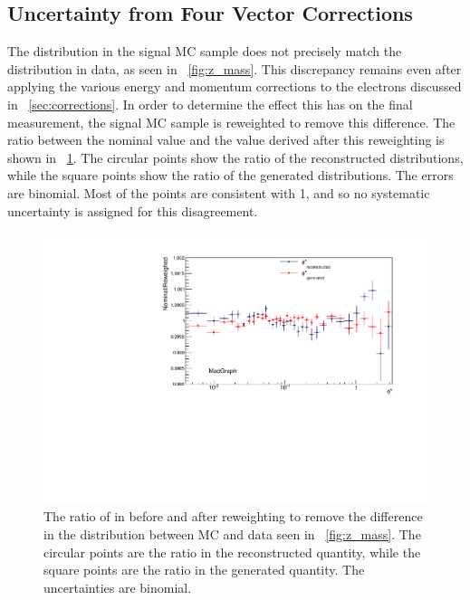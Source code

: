 \subsection{Uncertainty from Four Vector Corrections}
\label{four_vector_uncertainty}

The \mee distribution in the \MADGRAPH signal MC sample does not precisely
match the distribution in data, as seen in \FIG~\ref{fig:z_mass}. This
discrepancy remains even after applying the various energy and momentum
corrections to the electrons discussed in \SEC~\ref{sec:corrections}. In order
to determine the effect this has on the final measurement, the \MADGRAPH signal
MC sample is reweighted to remove this difference. The ratio between the
nominal \phistar value and the value derived after this reweighting is shown in
\FIG~\ref{fig:z_mass_reweighted}. The circular points show the ratio of the
reconstructed \phistar distributions, while the square points show the ratio of
the generated \phistar distributions. The errors are binomial. Most of the
points are consistent with \num{1}, and so no systematic uncertainty is
assigned for this disagreement.

\begin{figure}[!htbp]
    \centering
    \includegraphics[width=\textwidth]{figures/ZMass_reweighed.pdf}
    \caption[
        The ratio of \phistar in \MADGRAPH before and after reweighting to
        remove the differnce in the \mee distribution between MC and data.
    ]{
        The ratio of \phistar in \MADGRAPH before and after reweighting to
        remove the difference in the \mee distribution between MC and data seen
        in \FIG~\ref{fig:z_mass}. The circular points are the ratio in the
        reconstructed quantity, while the square points are the ratio in the
        generated quantity. The uncertainties are binomial.
    }
    \label{fig:z_mass_reweighted}
\end{figure}

